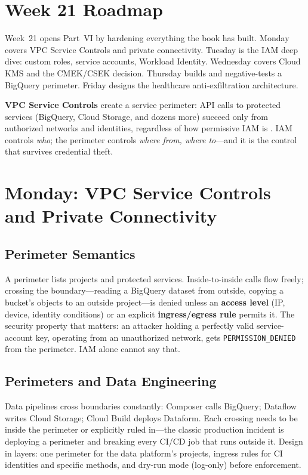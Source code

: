 \section{Week 21 Roadmap}
Week~21 opens Part~VI by hardening everything the book has built. Monday covers VPC Service Controls and private connectivity. Tuesday is the IAM deep dive: custom roles, service accounts, Workload Identity. Wednesday covers Cloud KMS and the CMEK/CSEK decision. Thursday builds and negative-tests a BigQuery perimeter. Friday designs the healthcare anti-exfiltration architecture.

\begin{definitionbox}
\textbf{VPC Service Controls} create a service perimeter: API calls to protected services (BigQuery, Cloud Storage, and dozens more) succeed only from authorized networks and identities, regardless of how permissive IAM is \cite{googlecloudvpcscdocs}. IAM controls \emph{who}; the perimeter controls \emph{where from, where to}---and it is the control that survives credential theft.
\end{definitionbox}

\section{Monday: VPC Service Controls and Private Connectivity}

\subsection{Perimeter Semantics}
A perimeter lists projects and protected services. Inside-to-inside calls flow freely; crossing the boundary---reading a BigQuery dataset from outside, copying a bucket's objects to an outside project---is denied unless an \textbf{access level} (IP, device, identity conditions) or an explicit \textbf{ingress/egress rule} permits it. The security property that matters: an attacker holding a perfectly valid service-account key, operating from an unauthorized network, gets \texttt{PERMISSION\_DENIED} from the perimeter. IAM alone cannot say that.

\subsection{Perimeters and Data Engineering}
Data pipelines cross boundaries constantly: Composer calls BigQuery; Dataflow writes Cloud Storage; Cloud Build deploys Dataform. Each crossing needs to be inside the perimeter or explicitly ruled in---the classic production incident is deploying a perimeter and breaking every CI/CD job that runs outside it. Design in layers: one perimeter for the data platform's projects, ingress rules for CI identities and specific methods, and dry-run mode (log-only) before enforcement.

